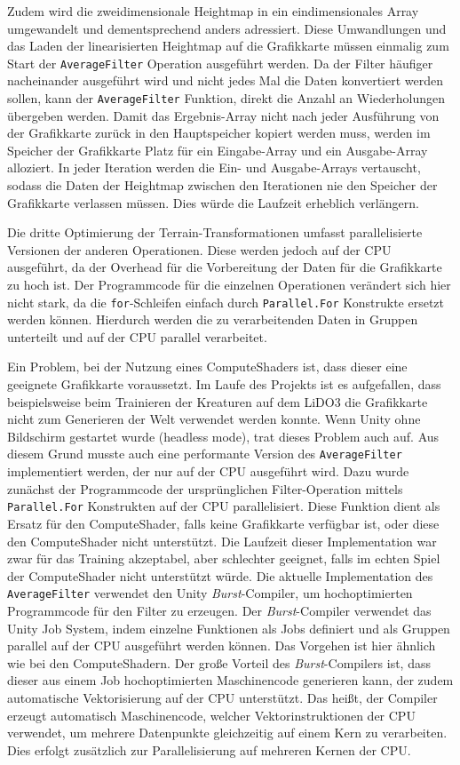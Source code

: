 Zudem wird die zweidimensionale Heightmap in ein eindimensionales Array umgewandelt und dementsprechend anders adressiert.
Diese Umwandlungen und das Laden der linearisierten Heightmap auf die Grafikkarte müssen einmalig zum Start der \texttt{AverageFilter} Operation ausgeführt werden.
Da der Filter häufiger nacheinander ausgeführt wird und nicht jedes Mal die Daten konvertiert werden sollen, kann der \texttt{AverageFilter} Funktion, direkt die Anzahl an Wiederholungen übergeben werden.
Damit das Ergebnis-Array nicht nach jeder Ausführung von der Grafikkarte zurück in den Hauptspeicher kopiert werden muss, werden im Speicher der Grafikkarte Platz für ein Eingabe-Array und ein Ausgabe-Array alloziert.
In jeder Iteration werden die Ein- und Ausgabe-Arrays vertauscht, sodass die Daten der Heightmap zwischen den Iterationen nie den Speicher der Grafikkarte verlassen müssen.
Dies würde die Laufzeit erheblich verlängern.

Die dritte Optimierung der Terrain-Transformationen umfasst parallelisierte Versionen der anderen Operationen.
Diese werden jedoch auf der CPU ausgeführt, da der Overhead für die Vorbereitung der Daten für die Grafikkarte zu hoch ist.
Der Programmcode für die einzelnen Operationen verändert sich hier nicht stark, da die \texttt{for}-Schleifen einfach durch \texttt{Parallel.For} Konstrukte ersetzt werden können.
Hierdurch werden die zu verarbeitenden Daten in Gruppen unterteilt und auf der CPU parallel verarbeitet.

Ein Problem, bei der Nutzung eines ComputeShaders ist, dass dieser eine geeignete Grafikkarte voraussetzt.
Im Laufe des Projekts ist es aufgefallen, dass beispielsweise beim Trainieren der Kreaturen auf dem LiDO3 die Grafikkarte nicht zum Generieren der Welt verwendet werden konnte.
Wenn Unity ohne Bildschirm gestartet wurde (headless mode), trat dieses Problem auch auf.
Aus diesem Grund musste auch eine performante Version des \texttt{AverageFilter} implementiert werden, der nur auf der CPU ausgeführt wird.
Dazu wurde zunächst der Programmcode der ursprünglichen Filter-Operation mittels \texttt{Parallel.For} Konstrukten auf der CPU parallelisiert.
Diese Funktion dient als Ersatz für den ComputeShader, falls keine Grafikkarte verfügbar ist, oder diese den ComputeShader nicht unterstützt.
Die Laufzeit dieser Implementation war zwar für das Training akzeptabel, aber schlechter geeignet, falls im echten Spiel der ComputeShader nicht unterstützt würde.
Die aktuelle Implementation des \texttt{AverageFilter} verwendet den Unity \textit{Burst}-Compiler, um hochoptimierten Programmcode für den Filter zu erzeugen.
Der \textit{Burst}-Compiler verwendet das Unity Job System, indem einzelne Funktionen als Jobs definiert und als Gruppen parallel auf der CPU ausgeführt werden können.
Das Vorgehen ist hier ähnlich wie bei den ComputeShadern.
Der große Vorteil des \textit{Burst}-Compilers ist, dass dieser aus einem Job hochoptimierten Maschinencode generieren kann, der zudem automatische Vektorisierung auf der CPU unterstützt.
Das heißt, der Compiler erzeugt automatisch Maschinencode, welcher Vektorinstruktionen der CPU verwendet, um mehrere Datenpunkte gleichzeitig auf einem Kern zu verarbeiten.
Dies erfolgt zusätzlich zur Parallelisierung auf mehreren Kernen der CPU.

